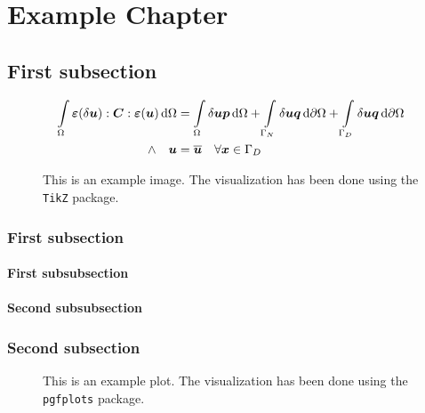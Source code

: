 \chapter{Example Chapter}
\blindtext[3]

\section{First subsection}
\blindtext[4]
\begin{equation}
	\begin{aligned}
		\int \limits_\Omega \boldsymbol{\varepsilon}(\delta\boldsymbol{u}) : \boldsymbol{C} : \boldsymbol{\varepsilon}(\boldsymbol{u})\,\mathrm{d}\Omega
		&= \int \limits_\Omega \delta\boldsymbol{u} \boldsymbol{p}\,\mathrm{d}\Omega
		 + \int \limits_{\Gamma_N} \delta\boldsymbol{u} \boldsymbol{q}\,\mathrm{d}\partial\Omega
		 + \int \limits_{\Gamma_D} \delta\boldsymbol{u} \boldsymbol{q}\,\mathrm{d}\partial\Omega \\
		\land \quad \boldsymbol{u} &= \overline{\boldsymbol{u}} \quad \forall \boldsymbol{x} \in \Gamma_D \\
	\end{aligned}
\end{equation}
\blindtext[2]
\begin{figure}
	\begin{center}
		
		\caption{This is an example image. The visualization has been done using the \texttt{TikZ} package.}
		\label{fig:example_tikz_image}
	\end{center}
\end{figure}
\subsection{First subsection}
 \blindtext[3]
\subsubsection{First subsubsection}
\blindtext[3]
\subsubsection{Second subsubsection}
\blindtext[3]
\subsection{Second subsection}
\blindtext[4]
\begin{figure}
	\begin{center}
		
		\caption{This is an example plot. The visualization has been done using the \texttt{pgfplots} package.}
		\label{fig:example_tikz_image}
	\end{center}
\end{figure}
\cite{bathe2007finite} \blindtext[5]

